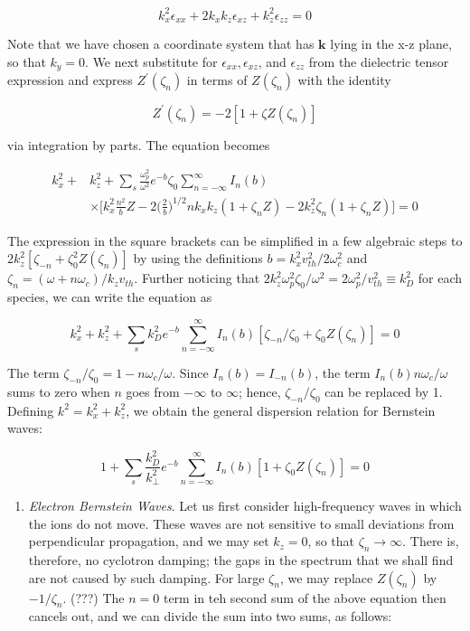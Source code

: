\documentclass[
  notoc %
]{tufte-book}
\providecommand{\tightlist}{%
  \setlength{\itemsep}{0pt}\setlength{\parskip}{0pt}
}
\begin{document}
\[
k_x^2 \epsilon_{xx} + 2k_x k_z \epsilon_{xz} + k_z^2 \epsilon_{zz} = 0
\]

Note that we have chosen a coordinate system that has \(\mathbf{k}\)
lying in the x-z plane, so that \(k_y=0\). We next substitute for
\(\epsilon_{xx},\epsilon_{xz}\), and \(\epsilon_{zz}\) from the
dielectric tensor expression and express \(Z^\prime(\zeta_n)\) in terms
of \(Z(\zeta_n)\) with the identity

\[
Z^\prime(\zeta_n) = -2[1+\zeta Z(\zeta_n)]
\]

via integration by parts. The equation becomes

\[
\begin{aligned}
k_x^2 + &k_z^2 + \sum_s\frac{\omega_p^2}{\omega^2}e^{-b}\zeta_0 \sum_{n=-\infty}^{\infty} I_n(b) \\
&\times \big[ k_x^2\frac{n^2}{b}Z - 2\big(\frac{2}{b}\big)^{1/2}nk_xk_z(1+\zeta_n Z)-2k_z^2 \zeta_n(1+\zeta_n Z) \big] = 0
\end{aligned}
\]

The expression in the square brackets can be simplified in a few
algebraic steps to \(2k_z^2[\zeta_{-n} + \zeta_0^2 Z(\zeta_n)]\) by
using the definitions \(b = k_x^2 v_{th}^2/2\omega_c^2\) and
\(\zeta_n=(\omega+n\omega_c)/k_zv_{th}\). Further noticing that
\(2k_z^2 \omega_p^2 \zeta_0/\omega^2 = 2\omega_p^2/v_{th}^2\equiv k_D^2\)
for each species, we can write the equation as

\[
k_x^2 + k_z^2 + \sum_s k_D^2 e^{-b}\sum_{n=-\infty}^{\infty} I_n(b)[\zeta_{-n}/\zeta_0 + \zeta_0 Z(\zeta_n)] = 0
\]

The term \(\zeta_{-n}/\zeta_0=1-n\omega_c/\omega\). Since
\(I_n(b)=I_{-n}(b)\), the term \(I_n(b)n\omega_c/\omega\) sums to zero
when \(n\) goes from \(-\infty\) to \(\infty\); hence,
\(\zeta_{-n}/\zeta_0\) can be replaced by 1. Defining
\(k^2 = k_x^2 + k_z^2\), we obtain the general dispersion relation for
Bernstein waves:

\[
1+ \sum_s\frac{k_D^2}{k_\perp^2}e^{-b}\sum_{n=-\infty}^{\infty} I_n(b)[1 + \zeta_0 Z(\zeta_n)] = 0
\]

\begin{enumerate}
\def\labelenumi{(\Alph{enumi})}
\tightlist
\item
  \emph{Electron Bernstein Waves}. Let us first consider high-frequency
  waves in which the ions do not move. These waves are not sensitive to
  small deviations from perpendicular propagation, and we may set
  \(k_z=0\), so that \(\zeta_n\rightarrow\infty\). There is, therefore,
  no cyclotron damping; the gaps in the spectrum that we shall find are
  not caused by such damping. For large \(\zeta_n\), we may replace
  \(Z(\zeta_n)\) by \(-1/\zeta_n\). (???) The \(n=0\) term in teh second
  sum of the above equation then cancels out, and we can divide the sum
  into two sums, as follows:
\end{enumerate}
\end{document}
